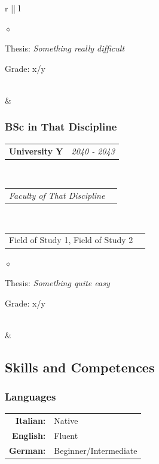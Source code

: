 \documentclass[a4paper]{article}
\makeatletter
\newlength{\sectsep}
\newlength{\subsectsep}
\newcommand{\headerrow}[2]
{\begin{tabular*}{\textwidth}{l@{\extracolsep{\fill}}r}
    #1 &
    #2 \\
\end{tabular*}}
\renewenvironment{itemize}{
  \begin{list}{$\diamond$}{
    \setlength{\topsep}{0.1em}
    \setlength{\itemsep}{0em}
    \setlength{\parskip}{0pt}
    \setlength{\parsep}{0em}
  }
}{
  \end{list}
}
\makeatother
\begin{document}
\begin{longtable}{r || l}
\begin{minipage}{0.9\textwidth}
      \begin{itemize}
          \item Thesis: \emph{Something really difficult}
          \item Grade: x/y
      \end{itemize}
  \end{minipage} \\[\sectsep]

  & \begin{minipage}{0.9\textwidth}
      \vspace{\subsectsep}
      \subsubsection*{BSc in That Discipline}
      \headerrow
        {\textbf{University Y}}{\emph{2040 - 2043}}
      \\
      \headerrow
        {\emph{Faculty of That Discipline}}{}
      \\
      \headerrow
        {Field of Study 1, Field of Study 2}{}

      \begin{itemize}
          \item Thesis: \emph{Something quite easy}
          \item Grade: x/y
      \end{itemize}
      \vfill
  \end{minipage} \\[\sectsep]

  & \begin{minipage}{0.9\textwidth}
      \vspace{\sectsep}
      \subsection*{Skills and Competences}
      \subsubsection*{Languages}
      \begin{tabular}{rl}
        \textbf{Italian:}&Native\\
        \textbf{English:}&Fluent\\
        \textbf{German:}&Beginner/Intermediate\\
      \end{tabular} \vspace{1.5ex} \\
    \end{minipage} \\[\sectsep]


\end{longtable}
\end{document}
